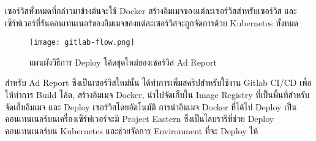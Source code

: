 เซอร์วิสทั้งหมดที่กล่าวมาข้างต้นจะใช้ Docker สร้างอิมเมจของแต่ละเซอร์วิสสำหรับเซอร์วิส และเซิร์ฟเวอร์ที่รันคอนเทนเนอร์ของอิมเมจของแต่ละเซอร์วิสจะถูกจัดการด้วย Kubernetes ทั้งหมด
\begin{figure}[!h]
	\centering
	\texttt{[image: gitlab-flow.png]}  
	\caption{แผนผังวิธีการ Deploy โค้ดชุดใหม่ของเซอร์วิส Ad Report}
	\label{Fig:adreport-diagram}
\end{figure}

สำหรับ Ad Report ซึ่งเป็นเซอร์วิสใหม่นั้น ได้ทำการเพิ่มสคริปสำหรับใช้งาน Gitlab CI/CD เพื่อให้ทำการ Build โค้ด, สร้างอิมเมจ Docker, นำไปจัดเก็บใน Image Registry ที่เป็นพื้นที่สำหรับจัดเก็บอิมเมจ และ Deploy เซอร์วิสโดยอัตโนมัติ การนำอิมเมจ Docker ที่ได้ไป Deploy เป็นคอนเทนเนอร์บนเครื่องเซิร์ฟเวอร์จะมี Project Eastern ซึ่งเป็นไลบรารีที่ช่วย Deploy คอนเทนเนอร์บน Kubernetes และช่วยจัดการ Environment ที่จะ Deploy ให้ ~\cite{eastern} 